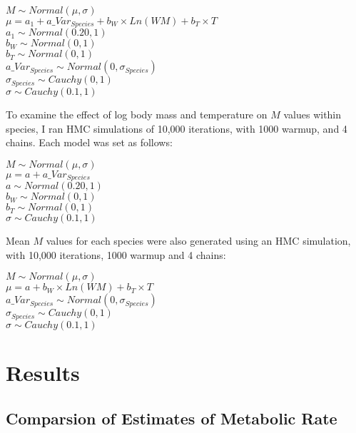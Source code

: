\documentclass[12pt, titlepage]{article}
\begin{document}
\begin{center}
$M \sim Normal(\mu, \sigma)$
\\$\mu = a_{1} + a\_Var_{Species} + b_{W} \times Ln(WM) + b_{T} \times T$
\\$a_{1} \sim Normal(0.20, 1)$
\\$b_{W} \sim Normal(0, 1)$
\\$b_{T} \sim Normal(0, 1)$
\\$a\_Var_{Species} \sim Normal(0, \sigma_{Species})$
\\$\sigma_{Species} \sim Cauchy(0, 1)$
\\$\sigma \sim Cauchy(0.1, 1)$
\end{center}

To examine the effect of log body mass and temperature on $M$ values within species, I ran HMC simulations of 10,000 iterations, with 1000 warmup, and 4 chains. 
Each model was set as follows:

\begin{center}
$M \sim Normal(\mu, \sigma)$
\\$\mu = a + a\_Var_{Species}$
\\$a \sim Normal(0.20, 1)$
\\$b_{W} \sim Normal(0, 1)$
\\$b_{T} \sim Normal(0, 1)$
\\$\sigma \sim Cauchy(0.1, 1)$
\end{center}

\pagebreak
Mean $M$ values for each species were also generated using an HMC simulation, with 10,000 iterations, 1000 warmup and 4 chains:

\begin{center}
$M \sim Normal(\mu, \sigma)$
\\$\mu = a + b_{W} \times Ln(WM) + b_{T} \times T$
\\$a\_Var_{Species} \sim Normal(0, \sigma_{Species})$
\\$\sigma_{Species} \sim Cauchy(0, 1)$
\\$\sigma \sim Cauchy(0.1, 1)$
\end{center}

\pagebreak
\section{Results}

\subsection{Comparsion of Estimates of Metabolic Rate}
\end{document}
